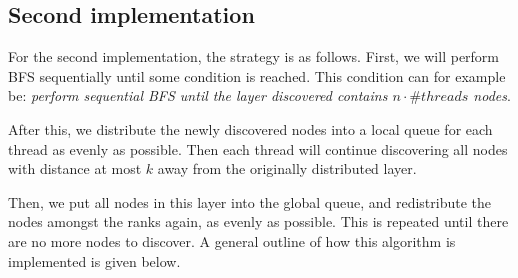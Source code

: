 \documentclass{article}
\begin{document}
\subsection{Second implementation}
For the second implementation, the strategy is as follows. First, we will perform BFS sequentially until some condition is reached. This condition can for example be: \textit{perform sequential BFS until the layer discovered contains \( n \cdot \#threads \) nodes}.
\medskip

After this, we distribute the newly discovered nodes into a local queue for each thread as evenly as possible. Then each thread will continue discovering all nodes with distance at most \( k \) away from the originally distributed layer. 
\medskip

Then, we put all nodes in this layer into the global queue, and redistribute the nodes amongst the ranks again, as evenly as possible. This is repeated until there are no more nodes to discover. A general outline of how this algorithm is implemented is given below.
\end{document}
